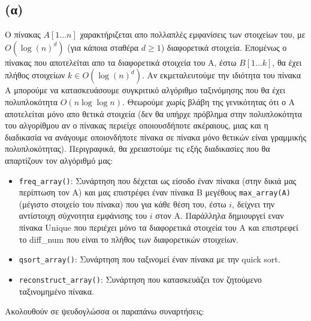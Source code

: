 \documentclass[a4paper,12pt]{report}
\begin{document}
\subsection*{(α)}
Ο πίνακας $A[1...n]$ χαρακτήριζεται απο πολλαπλές εμφανίσεις των στοιχείων του, με $O({\log(n)}^d)$ (για κάποια σταθέρα $d \geq 1$) διαφορετικά στοιχεία. Επομένως ο πίνακας που αποτελείται απο τα διαφορετικά στοιχεία του A, έστω $B[1...k]$, θα έχει πλήθος στοιχείων $k \in O({\log(n)}^d)$. Αν εκμεταλευτούμε την ιδιότητα του πίνακα Α μπορούμε να κατασκευάσουμε συγκριτικό αλγόριθμο ταξινόμησης που θα έχει πολυπλοκότητα $Ο(n\log \log n)$. Θεωρούμε χωρίς βλάβη της γενικότητας ότι ο Α αποτελείται μόνο απο θετικά στοιχεία (δεν θα υπήρχε πρόβλημα στην πολυπλοκότητα του αλγορίθμου αν ο πίνακας περιείχε οποιουσδήποτε ακέραιους, μιας και η διαδικασία να ανάγουμε οποιονδήποτε πίνακα σε πίνακα μόνο θετικών είναι γραμμικής πολυπλοκότητας).
Περιγραφικά, θα χρειαστούμε τις εξής διαδικασίες που θα απαρτίζουν τον αλγόριθμό μας:
\begin{itemize}
 \item \texttt{freq\_array()}: Συνάρτηση που δέχεται ως είσοδο έναν πίνακα (στην δικιά μας περίπτωση τον Α) και μας επιστρέφει έναν πίνακα Β μεγέθους
\texttt{max\_array(A)} (μέγιστο στοιχείο του πίνακα) που για κάθε θέση του, έστω $i$, δείχνει την αντίστοιχη σύχνοτητα εμφάνισης του $i$ στον Α. Παράλληλα δημιουργεί εναν πίνακα Unique που περιέχει μόνο τα διαφορετικά στοιχεία του Α και επιστρεφεί το diff\_num που είναι το πλήθος των διαφορετικών στοιχείων. 
 \item \texttt{qsort\_array()}: Συνάρτηση που ταξινομεί έναν πίνακα με την quick sort.
 \item \texttt{reconstruct\_array()}: Συνάρτηση που κατασκευάζει τον ζητούμενο ταξινομημένο πίνακα.
\end{itemize}

Ακολουθούν σε ψευδογλώσσα οι παραπάνω συναρτήσεις:
\end{document}
